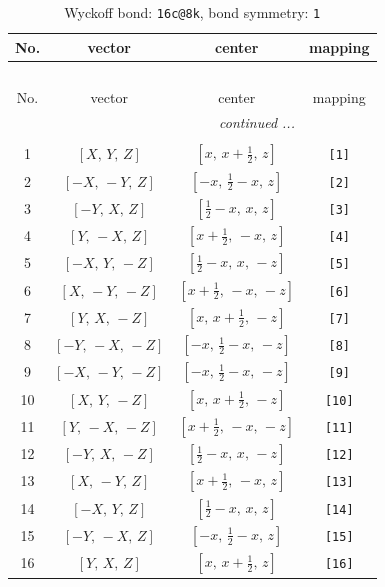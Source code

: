 \documentclass[fleqn,8pt]{jsarticle}
\begin{document}
\begin{longtable}{cccc}
\caption{Wyckoff bond: {\tt 16c@8k}, bond symmetry: {\tt 1}}
 \\
 \hline \hline
No. & vector & center & mapping \\ \hline \endfirsthead

\multicolumn{3}{l}{\tablename\ \thetable{}} \\
 \hline \hline
No. & vector & center & mapping \\ \hline \endhead

 \hline \hline
\multicolumn{3}{r}{\footnotesize\it continued ...} \\ \endfoot

 \hline \hline
\multicolumn{3}{r}{} \\ \endlastfoot

1 & $\left[ X,\, Y,\, Z \right]$ & $\left[ x,\, x + \frac{1}{2},\, z \right]$ & {\tt [1]} \\ \hline
2 & $\left[ - X,\, - Y,\, Z \right]$ & $\left[ - x,\, \frac{1}{2} - x,\, z \right]$ & {\tt [2]} \\ \hline
3 & $\left[ - Y,\, X,\, Z \right]$ & $\left[ \frac{1}{2} - x,\, x,\, z \right]$ & {\tt [3]} \\ \hline
4 & $\left[ Y,\, - X,\, Z \right]$ & $\left[ x + \frac{1}{2},\, - x,\, z \right]$ & {\tt [4]} \\ \hline
5 & $\left[ - X,\, Y,\, - Z \right]$ & $\left[ \frac{1}{2} - x,\, x,\, - z \right]$ & {\tt [5]} \\ \hline
6 & $\left[ X,\, - Y,\, - Z \right]$ & $\left[ x + \frac{1}{2},\, - x,\, - z \right]$ & {\tt [6]} \\ \hline
7 & $\left[ Y,\, X,\, - Z \right]$ & $\left[ x,\, x + \frac{1}{2},\, - z \right]$ & {\tt [7]} \\ \hline
8 & $\left[ - Y,\, - X,\, - Z \right]$ & $\left[ - x,\, \frac{1}{2} - x,\, - z \right]$ & {\tt [8]} \\ \hline
9 & $\left[ - X,\, - Y,\, - Z \right]$ & $\left[ - x,\, \frac{1}{2} - x,\, - z \right]$ & {\tt [9]} \\ \hline
10 & $\left[ X,\, Y,\, - Z \right]$ & $\left[ x,\, x + \frac{1}{2},\, - z \right]$ & {\tt [10]} \\ \hline
11 & $\left[ Y,\, - X,\, - Z \right]$ & $\left[ x + \frac{1}{2},\, - x,\, - z \right]$ & {\tt [11]} \\ \hline
12 & $\left[ - Y,\, X,\, - Z \right]$ & $\left[ \frac{1}{2} - x,\, x,\, - z \right]$ & {\tt [12]} \\ \hline
13 & $\left[ X,\, - Y,\, Z \right]$ & $\left[ x + \frac{1}{2},\, - x,\, z \right]$ & {\tt [13]} \\ \hline
14 & $\left[ - X,\, Y,\, Z \right]$ & $\left[ \frac{1}{2} - x,\, x,\, z \right]$ & {\tt [14]} \\ \hline
15 & $\left[ - Y,\, - X,\, Z \right]$ & $\left[ - x,\, \frac{1}{2} - x,\, z \right]$ & {\tt [15]} \\ \hline
16 & $\left[ Y,\, X,\, Z \right]$ & $\left[ x,\, x + \frac{1}{2},\, z \right]$ & {\tt [16]} \\
\end{longtable}
\end{document}
